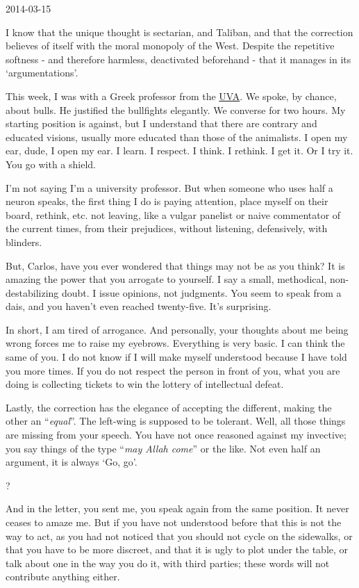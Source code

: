 \documentclass[]{book}
\begin{document}
2014-03-15

I know that the unique thought is sectarian, and Taliban, and that the correction believes of itself with the moral monopoly of the West. Despite the repetitive softness - and therefore harmless, deactivated beforehand - that it manages in its `argumentations'.

This week, I was with a Greek professor from the \href{https://en.wikipedia.org/wiki/University_of_Valladolid}{UVA}. We spoke, by chance, about bulls. He justified the bullfights elegantly. We converse for two hours. My starting position is against, but I understand that there are contrary and educated visions, usually more educated than those of the animalists. I open my ear, dude, I open my ear. I learn. I respect. I think. I rethink. I get it. Or I try it. You go with a shield.

I'm not saying I'm a university professor. But when someone who uses half a neuron speaks, the first thing I do is paying attention, place myself on their board, rethink, etc. not leaving, like a vulgar panelist or naive commentator of the current times, from their prejudices, without listening, defensively, with blinders.

But, Carlos, have you ever wondered that things may not be as you think? It is amazing the power that you arrogate to yourself. I say a small, methodical, non-destabilizing doubt. I issue opinions, not judgments. You seem to speak from a dais, and you haven't even reached twenty-five. It's surprising.

In short, I am tired of arrogance. And personally, your thoughts about me being wrong forces me to raise my eyebrows. Everything is very basic. I can think the same of you. I do not know if I will make myself understood because I have told you more times. If you do not respect the person in front of you, what you are doing is collecting tickets to win the lottery of intellectual defeat.

Lastly, the correction has the elegance of accepting the different, making the other an ``\emph{equal}''. The left-wing is supposed to be tolerant. Well, all those things are missing from your speech. You have not once reasoned against my invective; you say things of the type ``\emph{may Allah come}'' or the like. Not even half an argument, it is always `Go, go'.

?

And in the letter, you sent me, you speak again from the same position. It never ceases to amaze me. But if you have not understood before that this is not the way to act, as you had not noticed that you should not cycle on the sidewalks, or that you have to be more discreet, and that it is ugly to plot under the table, or talk about one in the way you do it, with third parties; these words will not contribute anything either.
\end{document}
